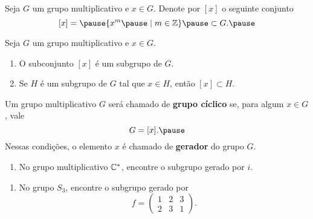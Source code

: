 \documentclass{beamer}
\begin{document}
    \begin{frame}
        Seja $G$ um grupo multiplicativo \pause e $x \in G$. \pause Denote por $[x]$ \pause o seguinte conjunto \pause
        \[
            [x] = \pause \{x^m \pause \mid m \in \z\} \pause \subset G.\pause
        \]

        \begin{proposicao}
            Seja $G$ um grupo multiplicativo \pause e $x \in G$. \pause
            \begin{enumerate}[label={\roman*})]
                \item O subconjunto $[x]$ \pause é um subgrupo de $G$.\pause

                \item Se $H$ é um subgrupo de $G$ \pause tal que $x \in H$, \pause então $[x] \subset H$.
            \end{enumerate}
        \end{proposicao}
    \end{frame}

    \begin{frame}
        \begin{definicao}
            Um grupo multiplicativo $G$ \pause será chamado de \textbf{grupo cíclico} \pause se, para algum $x \in G$, \pause vale \pause
            \[
                G = [x]. \pause
            \]
            Nessas condições, o elemento $x$  \pause é chamado de \textbf{gerador} do grupo $G$.
        \end{definicao}
    \end{frame}

    \begin{frame}
        \begin{exemplos}
            \begin{enumerate}[label={\roman*})]
                \item No grupo multiplicativo $\mathbb{C}^*$, \pause encontre o subgrupo gerado por $i$.
                \seti
            \end{enumerate}
        \end{exemplos}
    \end{frame}

    \begin{frame}
        \begin{exemplos}
            \begin{enumerate}[label={\roman*})]
                \conti
                \item No grupo $S_3$, \pause encontre o subgrupo gerado por
                \[
                    f = \begin{pmatrix}
                        1 & 2 & 3\\
                        2 & 3 & 1
                    \end{pmatrix}.
                \]
            \end{enumerate}
        \end{exemplos}
    \end{frame}
\end{document}
